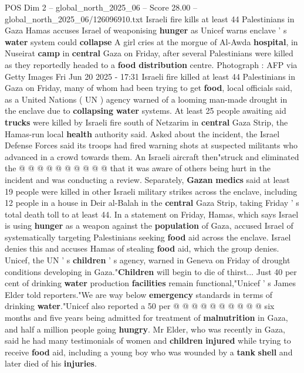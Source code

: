 \begin{textsample}{POS Dim 2 – global\_north\_2025\_06 – Score 28.00 – global\_north\_2025\_06/126096910.txt}  \label{ex:f2_pos_227}
Israeli fire kills at least 44 Palestinians in Gaza Hamas accuses Israel of weaponising \textbf{hunger} as Unicef warns enclave ' s \textbf{water} system could \textbf{collapse} A girl cries at the morgue of Al-Awda \textbf{hospital}, in Nuseirat \textbf{camp} in \textbf{central} Gaza on Friday, after several Palestinians were killed as they reportedly headed to a \textbf{food} \textbf{distribution} centre.
Photograph : AFP via Getty Images Fri Jun 20 2025 - 17:31 Israeli fire killed at least 44 Palestinians in Gaza on Friday, many of whom had been trying to get \textbf{food}, local officials said, as a United Nations ( UN ) agency warned of a looming man-made drought in the enclave due to \textbf{collapsing} \textbf{water} systems.
At least 25 people awaiting aid \textbf{trucks} were killed by Israeli fire south of Netzarim in \textbf{central} Gaza Strip, the Hamas-run local \textbf{health} authority said.
Asked about the incident, the Israel Defense Forces said its troops had fired warning shots at suspected militants who advanced in a crowd towards them.
An Israeli aircraft then"struck and eliminated the @ @ @ @ @ @ @ @ @ @ that it was aware of others being hurt in the incident and was conducting a review.
Separately, \textbf{Gazan} \textbf{medics} said at least 19 people were killed in other Israeli military strikes across the enclave, including 12 people in a house in Deir al-Balah in the \textbf{central} Gaza Strip, taking Friday ' s total death toll to at least 44.
In a statement on Friday, Hamas, which says Israel is using \textbf{hunger} as a weapon against the \textbf{population} of Gaza, accused Israel of systematically targeting Palestinians seeking \textbf{food} aid across the enclave.
Israel denies this and accuses Hamas of stealing \textbf{food} aid, which the group denies.
Unicef, the UN ' s \textbf{children} ' s agency, warned in Geneva on Friday of drought conditions developing in Gaza."\textbf{Children} will begin to die of thirst...
Just 40 per cent of drinking \textbf{water} production \textbf{facilities} remain functional,"Unicef ' s James Elder told reporters."We are way below \textbf{emergency} standards in terms of drinking \textbf{water}."Unicef also reported a 50 per @ @ @ @ @ @ @ @ @ @ six months and five years being admitted for treatment of \textbf{malnutrition} in Gaza, and half a million people going \textbf{hungry}.
Mr Elder, who was recently in Gaza, said he had many testimonials of women and \textbf{children} \textbf{injured} while trying to receive \textbf{food} aid, including a young boy who was wounded by a \textbf{tank} \textbf{shell} and later died of his \textbf{injuries}.

\end{textsample}
